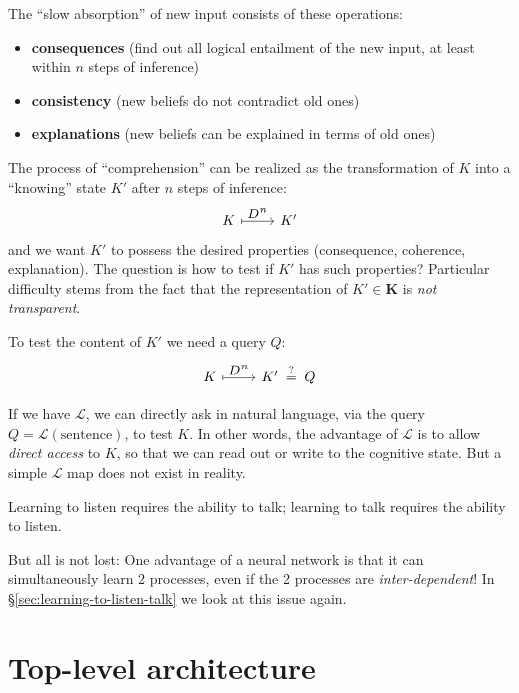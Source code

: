 \documentclass[12pt]{article}
\begin{document}
The ``slow absorption'' of new input consists of these operations:
\begin{itemize}
\item \textbf{consequences} (find out all logical entailment of the new input, at least within $n$ steps of inference)
\item \textbf{consistency} (new beliefs do not contradict old ones)
\item \textbf{explanations} (new beliefs can be explained in terms of old ones)
\end{itemize}

The process of ``comprehension'' can be realized as the transformation of $K$ into a ``knowing'' state $K'$ after $n$ steps of inference:
\begin{equation}
\begin{tikzcd}[row sep=tiny]
K \arrow[r, mapsto, "\scalebox{1.3}{$D^n$}"] & K'
\end{tikzcd}
\end{equation}
and we want $K'$ to possess the desired properties (consequence, coherence, explanation).  The question is how to test if $K'$ has such properties?  Particular difficulty stems from the fact that the representation of $K' \in \mathbf{K}$ is \textit{not transparent}.

To test the content of $K'$ we need a query $Q$:
\begin{equation}
\begin{tikzcd}[row sep=tiny]
K \arrow[r, mapsto, "\scalebox{1.3}{$D^n$}"] & K' \stackrel{?}{\;=\;} Q
\end{tikzcd}
\end{equation}

If we have $\mathcal{L}$, we can directly ask in natural language, via the query $Q = \mathcal{L}(\mbox{sentence})$, to test $K$.  In other words, the advantage of $\mathcal{L}$ is to allow \textit{direct access} to $K$, so that we can read out or write to the cognitive state.  But a simple $\mathcal{L}$ map does not exist in reality.

Learning to listen requires the ability to talk;  learning to talk requires the ability to listen.

But all is not lost:  One advantage of a neural network is that it can simultaneously learn 2 processes, even if the 2 processes are \textit{inter-dependent}!  In \S\ref{sec:learning-to-listen-talk} we look at this issue again.

\section{Top-level architecture}
\end{document}
